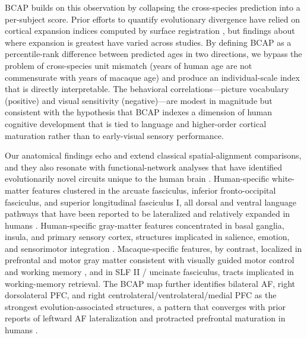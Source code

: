 \documentclass[11pt]{article}
\begin{document}
BCAP builds on this observation by collapsing the cross-species prediction into a per-subject score. Prior efforts to quantify evolutionary divergence have relied on cortical expansion indices computed by surface registration \citep{hill2010similar, smaers2019brain}, but findings about where expansion is greatest have varied across studies. By defining BCAP as a percentile-rank difference between predicted ages in two directions, we bypass the problem of cross-species unit mismatch (years of human age are not commensurate with years of macaque age) and produce an individual-scale index that is directly interpretable. The behavioral correlations---picture vocabulary (positive) and visual sensitivity (negative)---are modest in magnitude but consistent with the hypothesis that BCAP indexes a dimension of human cognitive development that is tied to language and higher-order cortical maturation rather than to early-visual sensory performance.

Our anatomical findings echo and extend classical spatial-alignment comparisons, and they also resonate with functional-network analyses that have identified evolutionarily novel circuits unique to the human brain \citep{mantini2013evolutionarily}. Human-specific white-matter features clustered in the arcuate fasciculus, inferior fronto-occipital fasciculus, and superior longitudinal fasciculus I, all dorsal and ventral language pathways that have been reported to be lateralized and relatively expanded in humans \citep{rilling2008evolution, rilling2012continuity, eichert2019special, balezeau2020primate, catani2008arcuate}. Human-specific gray-matter features concentrated in basal ganglia, insula, and primary sensory cortex, structures implicated in salience, emotion, and sensorimotor integration \citep{menon2010saliency}. Macaque-specific features, by contrast, localized in prefrontal and motor gray matter consistent with visually guided motor control and working memory \citep{smaers2011primate}, and in SLF II / uncinate fasciculus, tracts implicated in working-memory retrieval. The BCAP map further identifies bilateral AF, right dorsolateral PFC, and right centrolateral/ventrolateral/medial PFC as the strongest evolution-associated structures, a pattern that converges with prior reports of leftward AF lateralization and protracted prefrontal maturation in humans \citep{miller2012prolonged, smaers2011primate, patel2019temporoparietal}.
\end{document}
